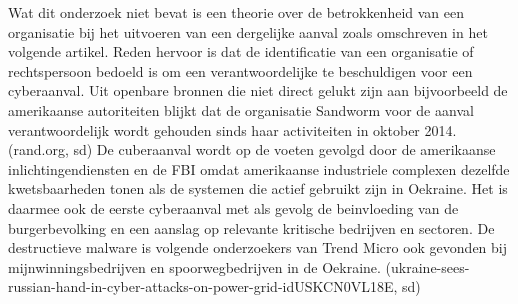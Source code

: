 {Wat dit onderzoek niet bevat is een theorie over de betrokkenheid van een organisatie bij het
uitvoeren van een dergelijke aanval zoals omschreven in het volgende artikel. Reden hervoor is dat
de identificatie van een organisatie of rechtspersoon bedoeld is om een verantwoordelijke te
beschuldigen voor een cyberaanval. Uit openbare bronnen die niet direct gelukt zijn aan bijvoorbeeld
de amerikaanse autoriteiten blijkt dat de organisatie Sandworm voor de aanval verantwoordelijk
wordt gehouden sinds haar activiteiten in oktober 2014.
(rand.org, sd)
De cuberaanval wordt op de voeten gevolgd door de amerikaanse inlichtingendiensten en de FBI
omdat amerikaanse industriele complexen dezelfde kwetsbaarheden tonen als de systemen die
actief gebruikt zijn in Oekraine. Het is daarmee ook de eerste cyberaanval met als gevolg de
beinvloeding van de burgerbevolking en een aanslag op relevante kritische bedrijven en sectoren. De
destructieve malware is volgende onderzoekers van Trend Micro ook gevonden bij
mijnwinningsbedrijven en spoorwegbedrijven in de Oekraine.
(ukraine-sees-russian-hand-in-cyber-attacks-on-power-grid-idUSKCN0VL18E, sd)

}
